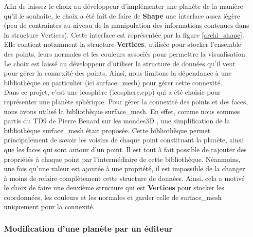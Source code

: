 \documentclass[a4paper]{article}
\begin{document}
Afin de laissez le choix au développeur d'implémenter une planète de la manière qu'il le souhaite, le choix a été fait de faire de \textbf{Shape} une interface assez légère (peu de contraintes au niveau de la manipulation des informations contenues dans la structure Vertices). Cette interface est représentée par la figure \ref{archi_shape}. Elle contient notamment la structure \textbf{Vertices}, utilisée pour stocker l'ensemble des points, leurs normales et les couleurs associés pour permettre la visualisation. Le choix est laissé au développeur d'utiliser la structure de données qu'il veut pour gérer la connexité des points. Ainsi, nous limitons la dépendance à une bibliothèque en particulier (ici surface\_mesh) pour gérer cette connexité. \\
Dans ce projet, c'est une icosphère (icosphere.cpp) qui a été choisie pour représenter une planète sphérique. Pour gérer la connexité des points et des faces, nous avons utilisé la bibliothèque surface\_mesh. En effet, comme nous sommes partis du TD9 de Pierre Benard sur les mondes3D \cite{TD_3D}, une simplification de la bibliothèque surface\_mesh était proposée. Cette bibliothèque permet principalement de savoir les voisins de chaque point constituant la planète, ainsi que les faces qui sont autour d'un point. Il est tout à fait possible de rajouter des propriétés à chaque point par l'intermédiaire de cette bibliothèque. Néanmoins, une fois qu'une valeur est ajoutée à une propriété, il est impossible de la changer à moins de refaire complètement cette structure de données. Ainsi, cela a motivé le choix de faire une deuxième structure qui est \textbf{Vertices} pour stocker les coordonnées, les couleurs et les normales et garder celle de surface\_mesh uniquement pour la connexité.

\subsubsection{Modification d'une planète par un éditeur}
\end{document}
